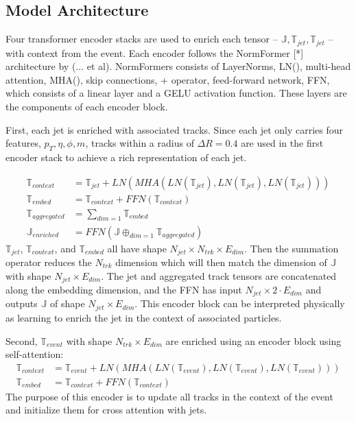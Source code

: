 \subsection{Model Architecture}\hfill

Four transformer encoder stacks are used to enrich each tensor -- $\mathbb{J},\mathbb{T}_{jet},\mathbb{T}_{jet}$ -- with context from the event. Each encoder follows the NormFormer [*] architecture by (... et al). NormFormers consists of LayerNorms, LN(), multi-head attention, MHA(), skip connections, + operator, feed-forward network, FFN, which consists of a linear layer and a GELU activation function. These layers are the components of each encoder block.


First, each jet is enriched with associated tracks. Since each jet only carries four features, $p_T, \eta, \phi, m$, tracks within a radius of $\Delta R = 0.4$ are used in the first encoder stack to achieve a rich representation of each jet.

\begin{align}
    \mathbb{T}_{context} &= \mathbb{T}_{jet} + LN(MHA(LN(\mathbb{T}_{jet}), LN(\mathbb{T}_{jet}), LN(\mathbb{T}_{jet}))) \\
    \mathbb{T}_{embed} &= \mathbb{T}_{context} + FFN (\mathbb{T}_{context}) \\
    \mathbb{T}_{aggregated} &= \sum_{dim=1} \mathbb{T}_{embed} \\ 
    \mathbb{J}_{enriched} &= FFN(\mathbb{J} \mathop{\oplus}_{dim=1} \mathbb{T}_{aggregated})
\end{align}
$\mathbb{T}_{jet}$, $\mathbb{T}_{context}$, and $\mathbb{T}_{embed}$ all have shape $N_{jet} \times N_{trk} \times E_{dim}$. Then the summation operator reduces the $N_{trk}$ dimension which will then match the dimension of $\mathbb{J}$ with shape $N_{jet} \times E_{dim}$. The jet and aggregated track tensors are concatenated along the embedding dimension, and the FFN has input $N_{jet} \times 2\cdot E_{dim}$ and outputs $\mathbb{J}$ of shape $N_{jet} \times E_{dim}$. This encoder block can be interpreted physically as learning to enrich the jet in the context of associated particles. %

Second, $\mathbb{T}_{event}$ with shape $N_{trk} \times E_{dim}$ are enriched using an encoder block using self-attention:
\begin{align}
    \mathbb{T}_{context} &= \mathbb{T}_{event} + LN(MHA(LN(\mathbb{T}_{event}), LN(\mathbb{T}_{event}), LN(\mathbb{T}_{event}))) \\
    \mathbb{T}_{embed} &= \mathbb{T}_{context} + FFN (\mathbb{T}_{context})
\end{align}
The purpose of this encoder is to update all tracks in the context of the event and initialize them for cross attention with jets.


